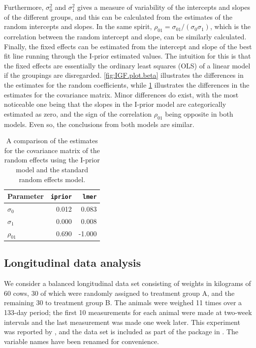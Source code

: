 \documentclass[showframe,11pt,twoside,openright]{report}\usepackage[]{graphicx}\usepackage[]{color}
\begin{document}
Furthermore, $\sigma_0^2$ and $\sigma_1^2$ gives a measure of variability of the intercepts and slopes of the different groups, and this can be calculated from the estimates of the random intercepts and slopes.
In the same spirit, $\rho_{01} = \sigma_{01} / (\sigma_0 \sigma_1)$, which is the correlation between the random intercept and slope, can be similarly calculated.
Finally, the fixed effects can be estimated from the intercept and slope of the best fit line running through the I-prior estimated  values.
The intuition for this is that the fixed effects are essentially the ordinary least squares (OLS) of a linear model if the groupings are disregarded.
\cref{fig:IGF.plot.beta} illustrates the differences in the estimates for the random coefficients, while  \cref{tab:igf} illustrates the differences in the estimates for the covariance matrix.
Minor differences do exist, with the most noticeable one being that the slopes in the I-prior model are categorically estimated as zero, and the sign of the correlation $\rho_{01}$ being opposite in both models.
Even so, the conclusions from both models are similar.

\begin{table}[htb]
\centering
\caption{A comparison of the estimates for the covariance matrix of the random effects using the I-prior model and the standard random effects model.}
\label{tab:igf}
\begin{tabular}{lrr}
\toprule
Parameter     & \texttt{iprior} & \texttt{lmer} \\
\midrule
$\sigma_0$    & 0.012 & 0.083 \\
$\sigma_1$    & 0.000 & 0.008 \\
$\rho_{01}$   & 0.690& -1.000 \\
\bottomrule
\end{tabular}
\end{table}

\subsection{Longitudinal data analysis}
\label{sec:cows}

We consider a balanced longitudinal data set consisting of weights in kilograms of 60 cows, 30 of which were randomly assigned to treatment group A, and the remaining 30 to treatment group B.
The animals were weighed 11 times over a 133-day period; the first 10 measurements for each animal were made at two-week intervals and the last measurement was made one week later.
This experiment was reported by \citet{kenward1987method}, and the data set is included as part of the package  \citep{jmcm} in .
The variable names have been renamed for convenience.
\end{document}
